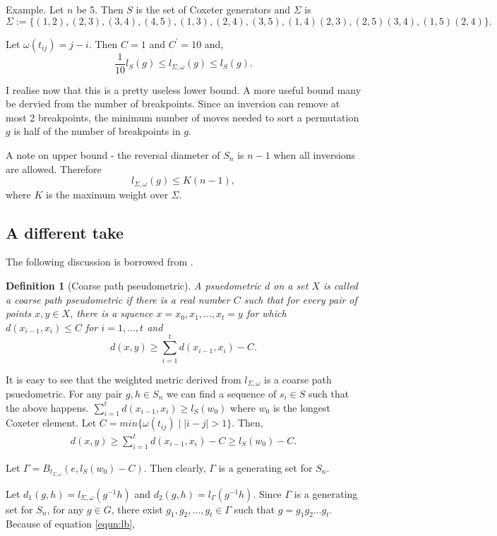 \documentclass{article}
\newtheorem{definition}{Definition}
\begin{document}
Example. Let $n$ be 5. Then $S$ is the set of Coxeter generators and $\Sigma$ is
\[\Sigma:=\{(1,2),(2,3),(3,4),(4,5),(1,3),(2,4),(3,5),(1,4)(2,3),(2,5)(3,4),(1,5)(2,4)\}.\]

Let $\omega(t_{ij})=j-i$. Then $C=1$ and $C^{\prime}=10$ and,
\[\frac{1}{10}l_S(g) \leq l_{\Sigma,\omega}(g) \leq l_S(g).\]

I realise now that this is a pretty useless lower bound. A more useful bound many be dervied from the number of breakpoints. Since an inversion can remove at most 2 breakpoints, the minimum number of moves needed to sort a permutation $g$ is half of the number of breakpoints in $g$.

A note on upper bound -  the reversal diameter of $S_n$ is $n - 1$ when all inversions are allowed. Therefore
\[l_{\Sigma,\omega}(g) \leq K(n-1),\]
where $K$ is the maximum weight over $\Sigma$.
\subsection{A different take}
The following discussion is borrowed from \citep*{abels2004reductive}.
\begin{definition}[Coarse path pseudometric] \citep*{abels2004reductive}
A psuedometric $d$ on a set $X$ is called a coarse path pseudometric if there is a real number $C$ such that for every pair of points $x,y \in X$, there is a squence $x=x_0,x_1,\hdots,x_t=y$ for which $d(x_{i-1},x_i) \leq C$ for $i=1,\hdots,t$ and
\[d(x,y) \geq \sum_{i=1}^{t}{d(x_{i-1},x_i)} - C.\]
\end{definition}

It is easy to see that the weighted metric derived from $l_{\Sigma,\omega}$ is a coarse path psuedometric. For any pair $g,h \in S_{n}$ we can find a sequence of $s_i \in S$ such that the above happens. $\sum_{i=1}^{t}{d(x_{i-1},x_i)} \geq l_S(w_0)$ where $w_0$ is the longest Coxeter element. Let $C = min\{\omega(t_{ij}) \mid |i-j|>1\}$. Then,
\begin{align}\label{equn:lb}
d(x,y) \geq \sum_{i=1}^{t}{d(x_{i-1},x_i)} - C \geq l_S(w_0) -C.
\end{align}


Let $\Gamma = B_{l_{\Sigma,\omega}}(e,l_S(w_0) -C)$. Then clearly, $\Gamma$ is a generating set for $S_n$.

Let $d_1(g,h)=l_{\Sigma,\omega}(g^{-1}h)$ and $d_2(g,h)=l_{\Gamma}(g^{-1}h)$. Since $\Gamma$ is a generating set for $S_n$, for any $g \in G$, there exist $g_1,g_2,\hdots,g_t \in \Gamma$ such that $g=g_1g_2 \hdots g_t$. Because of equation \ref{equn:lb},
\end{document}
